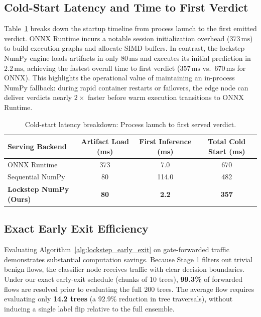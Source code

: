 \subsection{Cold-Start Latency and Time to First Verdict}

Table~\ref{tab:coldstart} breaks down the startup timeline from process launch to the first emitted verdict. ONNX Runtime incurs a notable session initialization overhead ($373\,\text{ms}$) to build execution graphs and allocate SIMD buffers. In contrast, the lockstep NumPy engine loads artifacts in only $80\,\text{ms}$ and executes its initial prediction in $2.2\,\text{ms}$, achieving the fastest overall time to first verdict ($357\,\text{ms}$ vs.\ $670\,\text{ms}$ for ONNX). This highlights the operational value of maintaining an in-process NumPy fallback: during rapid container restarts or failovers, the edge node can deliver verdicts nearly $2\times$ faster before warm execution transitions to ONNX Runtime.

\begin{table}[t]
  \caption{Cold-start latency breakdown: Process launch to first served verdict.}
  \label{tab:coldstart}
  \centering
  \small
  \begin{tabular}{l c c c}
    \toprule
    Serving Backend & Artifact Load (ms) & First Inference (ms) & Total Cold Start (ms) \\
    \midrule
    ONNX Runtime & 373 & 7.0 & 670 \\
    Sequential NumPy & 80 & 114.0 & 482 \\
    \textbf{Lockstep NumPy (Ours)} & \textbf{80} & \textbf{2.2} & \textbf{357} \\
    \bottomrule
  \end{tabular}
\end{table}

\subsection{Exact Early Exit Efficiency}

Evaluating Algorithm~\ref{alg:lockstep_early_exit} on gate-forwarded traffic demonstrates substantial computation savings. Because Stage 1 filters out trivial benign flows, the classifier node receives traffic with clear decision boundaries. Under our exact early-exit schedule (chunks of 10 trees), \textbf{99.3\%} of forwarded flows are resolved prior to evaluating the full 200 trees. The average flow requires evaluating only \textbf{14.2 trees} (a $\mathbf{92.9\%}$ reduction in tree traversals), without inducing a single label flip relative to the full ensemble.
